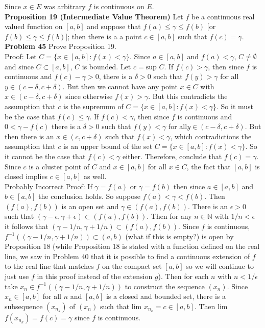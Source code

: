 \documentclass[a4paper]{article}
\begin{document}
Since $x \in E$ was arbitrary $f$ is continuous on $E$. \\

{\bf Proposition 19 (Intermediate Value Theorem)} Let $f$ be a continuous real valued function on $[a,b]$ and suppose that $f(a) \leq \gamma \leq f(b)$ [or $f(b) \leq \gamma \leq f(b)$]; then there is a a point $c \in [a,b]$ such that $f(c) = \gamma$. \\
 
{\bf Problem 45} Prove Proposition 19. \\

Proof: Let $C = \{x \in [a,b] : f(x) < \gamma\}$. Since $a \in [a,b]$ and $f(a) < \gamma$, $C \neq \emptyset$ and since $C \subset [a,b]$, $C$ is bounded. Let $c = \text{sup } C$. If $f(c) > \gamma$, then since $f$ is continuous and $f(c) - \gamma > 0$, there is a $\delta > 0$ such that $f(y) > \gamma$ for all $y \in (c-\delta, c+\delta)$. But then we cannot have any point $x \in C$ with $x \in ( c- \delta, c+\delta)$ since otherwise $f(x) > \gamma$. But this contradicts the assumption that $c$ is the supremum of $C = \{x \in [a,b] : f(x) < \gamma\}$. So it must be the case that $f(c) \leq \gamma$. If $f(c) < \gamma$, then since $f$ is continuous and $0<\gamma - f(c)$ there is a $\delta > 0$ such that $f(y) < \gamma$ for all$y \in (c-\delta, c+\delta)$. But then there is an $x \in (c,c+\delta)$ such that $f(x) < \gamma$, which contradictions the assumption that $c$ is an upper bound of the set $C = \{x \in [a,b] : f(x) < \gamma\}$. So it cannot be the case that $f(c) < \gamma$ either. Therefore, conclude that $f(c) = \gamma$. Since $c$ is a cluster point of $C$ and $x\in [a,b]$ for all $x \in C$, the fact that $[a,b]$ is closed implies $c \in [a,b]$ as well. \\

Probably Incorrect Proof: If $\gamma = f(a)$ or $\gamma = f(b)$ then since $a \in [a,b]$ and $b \in [a,b]$ the conclusion holds. So suppose $f(a) < \gamma < f(b)$. Then $(f(a),f(b))$ is an open set and $\gamma \in (f(a),f(b))$. There is an $\epsilon > 0$ such that $(\gamma - \epsilon, \gamma + \epsilon) \subset (f(a),f(b))$. Then for any $n \in \mathbb{N}$ with $1/n<\epsilon$ it follows that $(\gamma-1/n, \gamma + 1/n) \subset (f(a),f(b))$. Since $f$ is continuous, $f^{-1}((\gamma-1/n, \gamma + 1/n)) \subset (a,b)$ (what if this is empty?) is open by Proposition 18 (while Proposition 18 is stated with a function defined on the real line, we saw in Problem 40 that it is possible to find a continuous extension of $f$ to the real line that matches $f$ on the compact set $[a,b]$ so we will continue to just use $f$ in this proof instead of the extension $g$). Then for each $n$ with $n<1/\epsilon$ take $x_n \in f^{-1}((\gamma-1/n, \gamma + 1/n))$ to construct the sequence $(x_n)$. Since $x_n \in [a,b]$ for all $n$ and $[a,b]$ is a closed and bounded set, there is a subsequence $(x_{n_k})$ of $(x_n)$ such that lim $x_{n_k} = c \in [a,b]$. Then lim $f(x_{n_k}) = f(c) = \gamma$ since $f$ is continuous. \\
\end{document}
